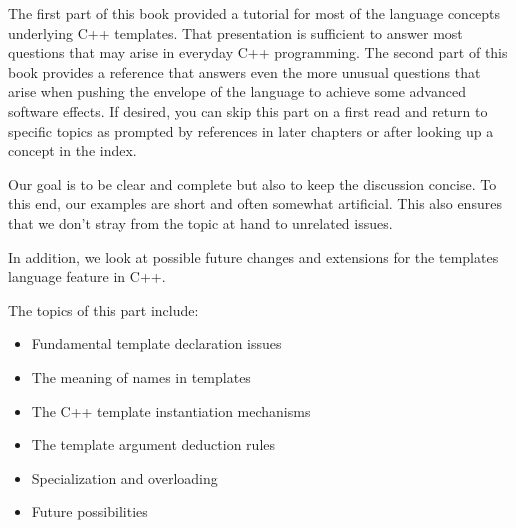 The first part of this book provided a tutorial for most of the language concepts underlying C++ templates. That presentation is sufficient to answer most questions that may arise in everyday C++ programming. The second part of this book provides a reference that answers even the more unusual questions that arise when pushing the envelope of the language to achieve some advanced software effects. If desired, you can skip this part on a first read and return to specific topics as prompted by references in later chapters or after looking up a concept in the index.

Our goal is to be clear and complete but also to keep the discussion concise. To this end, our examples are short and often somewhat artificial. This also ensures that we don’t stray from the topic at hand to unrelated issues.

In addition, we look at possible future changes and extensions for the templates language feature in C++.

The topics of this part include:

\begin{itemize}
\item 
Fundamental template declaration issues

\item 
The meaning of names in templates

\item 
The C++ template instantiation mechanisms

\item 
The template argument deduction rules

\item 
Specialization and overloading

\item 
Future possibilities
\end{itemize}
	
	
	
	
	